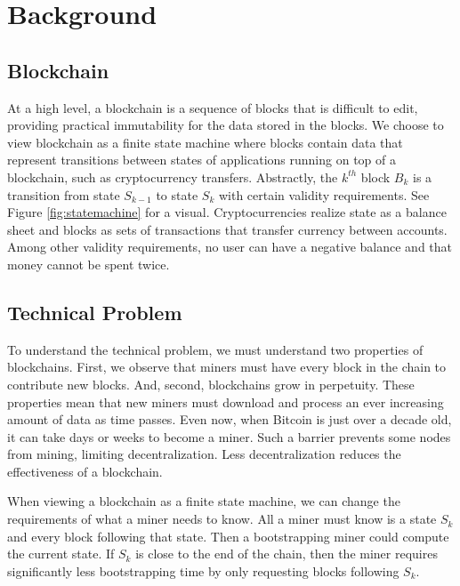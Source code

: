 \section{Background}
\label{sec:background}

\subsection{Blockchain}

At a high level, a blockchain is a sequence of blocks that is difficult to edit, providing practical immutability for the data stored in the blocks.
We choose to view blockchain as a finite state machine where blocks contain data that represent transitions between states of applications running on top of a blockchain, such as cryptocurrency transfers.
Abstractly, the $k^{th}$ block $B_k$ is a transition from state $S_{k-1}$ to state $S_k$ with certain validity requirements.
See Figure \ref{fig:statemachine} for a visual.
Cryptocurrencies realize state as a balance sheet and blocks as sets of transactions that transfer currency between accounts.
Among other validity requirements, no user can have a negative balance and that money cannot be spent twice.



\subsection{Technical Problem}

To understand the technical problem, we must understand two properties of blockchains.
First, we observe that miners must have every block in the chain to contribute new blocks.
And, second, blockchains grow in perpetuity.
These properties mean that new miners must download and process an ever increasing amount of data as time passes.
Even now, when Bitcoin is just over a decade old, it can take days or weeks to become a miner.
Such a barrier prevents some nodes from mining, limiting decentralization.
Less decentralization reduces the effectiveness of a blockchain.

When viewing a blockchain as a finite state machine, we can change the requirements of what a miner needs to know.
All a miner must know is a state $S_k$ and every block following that state.
Then a bootstrapping miner could compute the current state.
If $S_k$ is close to the end of the chain, then the miner requires significantly less bootstrapping time by only requesting blocks following $S_k$.

